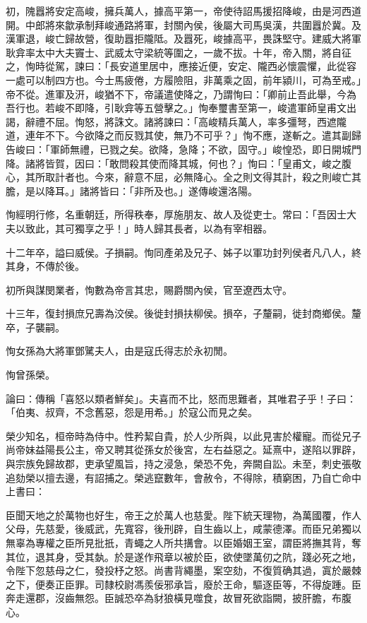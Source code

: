 \begin{pinyinscope}
初，隗囂將安定高峻，擁兵萬人，據高平第一，帝使待詔馬援招降峻，由是河西道開。中郎將來歙承制拜峻通路將軍，封關內侯，後屬大司馬吳漢，共圍囂於冀。及漢軍退，峻亡歸故營，復助囂拒隴阺。及囂死，峻據高平，畏誅堅守。建威大將軍耿弇率太中大夫竇士、武威太守梁統等圍之，一歲不拔。十年，帝入關，將自征之，恂時從駕，諫曰：「長安道里居中，應接近便，安定、隴西必懷震懼，此從容一處可以制四方也。今士馬疲倦，方履險阻，非萬乘之固，前年潁川，可為至戒。」帝不從。進軍及汧，峻猶不下，帝議遣使降之，乃謂恂曰：「卿前止吾此舉，今為吾行也。若峻不即降，引耿弇等五營擊之。」恂奉璽書至第一，峻遣軍師皇甫文出謁，辭禮不屈。恂怒，將誅文。諸將諫曰：「高峻精兵萬人，率多彊弩，西遮隴道，連年不下。今欲降之而反戮其使，無乃不可乎？」恂不應，遂斬之。遣其副歸告峻曰：「軍師無禮，已戮之矣。欲降，急降；不欲，固守。」峻惶恐，即日開城門降。諸將皆賀，因曰：「敢問殺其使而降其城，何也？」恂曰：「皇甫文，峻之腹心，其所取計者也。今來，辭意不屈，必無降心。全之則文得其計，殺之則峻亡其膽，是以降耳。」諸將皆曰：「非所及也。」遂傳峻還洛陽。

恂經明行修，名重朝廷，所得秩奉，厚施朋友、故人及從吏士。常曰：「吾因士大夫以致此，其可獨享之乎！」時人歸其長者，以為有宰相器。

十二年卒，謚曰威侯。子損嗣。恂同產弟及兄子、姊子以軍功封列侯者凡八人，終其身，不傳於後。

初所與謀閔業者，恂數為帝言其忠，賜爵關內侯，官至遼西太守。

十三年，復封損庶兄壽為洨侯。後徙封損扶柳侯。損卒，子釐嗣，徙封商鄉侯。釐卒，子襲嗣。

恂女孫為大將軍鄧騭夫人，由是寇氏得志於永初閒。

恂曾孫榮。

論曰：傳稱「喜怒以類者鮮矣」。夫喜而不比，怒而思難者，其唯君子乎！子曰：「伯夷、叔齊，不念舊惡，怨是用希。」於寇公而見之矣。

榮少知名，桓帝時為侍中。性矜絜自貴，於人少所與，以此見害於權寵。而從兄子尚帝妹益陽長公主，帝又聘其從孫女於後宮，左右益惡之。延熹中，遂陷以罪辟，與宗族免歸故郡，吏承望風旨，持之浸急，榮恐不免，奔闕自訟。未至，刺史張敬追劾榮以擅去邊，有詔捕之。榮逃竄數年，會赦令，不得除，積窮困，乃自亡命中上書曰：

臣聞天地之於萬物也好生，帝王之於萬人也慈愛。陛下統天理物，為萬國覆，作人父母，先慈愛，後威武，先寬容，後刑辟，自生齒以上，咸蒙德澤。而臣兄弟獨以無辜為專權之臣所見批扺，青蠅之人所共搆會。以臣婚姻王室，謂臣將撫其背，奪其位，退其身，受其埶。於是遂作飛章以被於臣，欲使墜萬仞之阬，踐必死之地，令陛下忽慈母之仁，發投杼之怒。尚書背繩墨，案空劾，不復質确其過，寘於嚴棘之下，便奏正臣罪。司隸校尉馮羨佞邪承旨，廢於王命，驅逐臣等，不得旋踵。臣奔走還郡，沒齒無怨。臣誠恐卒為豺狼橫見噬食，故冒死欲詣闕，披肝膽，布腹心。


\end{pinyinscope}

